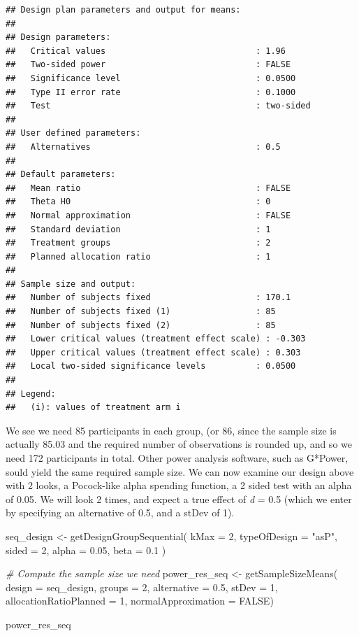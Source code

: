 \documentclass[
  oneside]{book}
\newenvironment{Shaded}{\begin{snugshade}}{\end{snugshade}}
\newcommand{\AttributeTok}[1]{\textcolor[rgb]{0.77,0.63,0.00}{#1}}
\newcommand{\CommentTok}[1]{\textcolor[rgb]{0.56,0.35,0.01}{\textit{#1}}}
\newcommand{\ConstantTok}[1]{\textcolor[rgb]{0.00,0.00,0.00}{#1}}
\newcommand{\DecValTok}[1]{\textcolor[rgb]{0.00,0.00,0.81}{#1}}
\newcommand{\FloatTok}[1]{\textcolor[rgb]{0.00,0.00,0.81}{#1}}
\newcommand{\FunctionTok}[1]{\textcolor[rgb]{0.00,0.00,0.00}{#1}}
\newcommand{\NormalTok}[1]{#1}
\newcommand{\OtherTok}[1]{\textcolor[rgb]{0.56,0.35,0.01}{#1}}
\newcommand{\StringTok}[1]{\textcolor[rgb]{0.31,0.60,0.02}{#1}}
\begin{document}
\begin{verbatim}
## Design plan parameters and output for means:
## 
## Design parameters:
##   Critical values                              : 1.96 
##   Two-sided power                              : FALSE 
##   Significance level                           : 0.0500 
##   Type II error rate                           : 0.1000 
##   Test                                         : two-sided 
## 
## User defined parameters:
##   Alternatives                                 : 0.5 
## 
## Default parameters:
##   Mean ratio                                   : FALSE 
##   Theta H0                                     : 0 
##   Normal approximation                         : FALSE 
##   Standard deviation                           : 1 
##   Treatment groups                             : 2 
##   Planned allocation ratio                     : 1 
## 
## Sample size and output:
##   Number of subjects fixed                     : 170.1 
##   Number of subjects fixed (1)                 : 85 
##   Number of subjects fixed (2)                 : 85 
##   Lower critical values (treatment effect scale) : -0.303 
##   Upper critical values (treatment effect scale) : 0.303 
##   Local two-sided significance levels          : 0.0500 
## 
## Legend:
##   (i): values of treatment arm i
\end{verbatim}

We see we need 85 participants in each group, (or 86, since the sample size is actually 85.03 and the required number of observations is rounded up, and so we need 172 participants in total. Other power analysis software, such as G*Power, sould yield the same required sample size. We can now examine our design above with 2 looks, a Pocock-like alpha spending function, a 2 sided test with an alpha of 0.05. We will look 2 times, and expect a true effect of \emph{d} = 0.5 (which we enter by specifying an alternative of 0.5, and a stDev of 1).

\begin{Shaded}
\begin{Highlighting}[]
\NormalTok{seq\_design }\OtherTok{\textless{}{-}} \FunctionTok{getDesignGroupSequential}\NormalTok{(}
  \AttributeTok{kMax =} \DecValTok{2}\NormalTok{,}
  \AttributeTok{typeOfDesign =} \StringTok{"asP"}\NormalTok{,}
  \AttributeTok{sided =} \DecValTok{2}\NormalTok{,}
  \AttributeTok{alpha =} \FloatTok{0.05}\NormalTok{,}
  \AttributeTok{beta =} \FloatTok{0.1}
\NormalTok{  )}

\CommentTok{\# Compute the sample size we need}
\NormalTok{power\_res\_seq }\OtherTok{\textless{}{-}} \FunctionTok{getSampleSizeMeans}\NormalTok{(}
  \AttributeTok{design =}\NormalTok{ seq\_design,}
  \AttributeTok{groups =} \DecValTok{2}\NormalTok{,}
  \AttributeTok{alternative =} \FloatTok{0.5}\NormalTok{, }
  \AttributeTok{stDev =} \DecValTok{1}\NormalTok{, }
  \AttributeTok{allocationRatioPlanned =} \DecValTok{1}\NormalTok{,}
  \AttributeTok{normalApproximation =} \ConstantTok{FALSE}\NormalTok{)}

\NormalTok{power\_res\_seq}
\end{Highlighting}
\end{Shaded}
\end{document}
